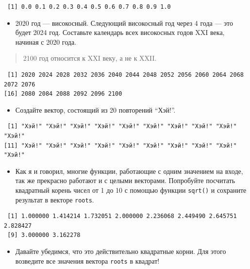 \documentclass[
]{book}
\providecommand{\tightlist}{%
  \setlength{\itemsep}{0pt}\setlength{\parskip}{0pt}}
\begin{document}
\begin{verbatim}
 [1] 0.0 0.1 0.2 0.3 0.4 0.5 0.6 0.7 0.8 0.9 1.0
\end{verbatim}

\begin{itemize}
\tightlist
\item
  2020 год --- високосный. Следующий високосный год через 4 года --- это будет 2024 год. Составьте календарь всех високосных годов XXI века, начиная с 2020 года.
\end{itemize}

\begin{quote}
2100 год относится к XXI веку, а не к XXII.
\end{quote}

\begin{verbatim}
 [1] 2020 2024 2028 2032 2036 2040 2044 2048 2052 2056 2060 2064 2068 2072 2076
[16] 2080 2084 2088 2092 2096 2100
\end{verbatim}

\begin{itemize}
\tightlist
\item
  Создайте вектор, состоящий из 20 повторений ``Хэй!''.
\end{itemize}

\begin{verbatim}
 [1] "Хэй!" "Хэй!" "Хэй!" "Хэй!" "Хэй!" "Хэй!" "Хэй!" "Хэй!" "Хэй!" "Хэй!"
[11] "Хэй!" "Хэй!" "Хэй!" "Хэй!" "Хэй!" "Хэй!" "Хэй!" "Хэй!" "Хэй!" "Хэй!"
\end{verbatim}

\begin{itemize}
\tightlist
\item
  Как я и говорил, многие функции, работающие с одним значением на входе, так же прекрасно работают и с целыми векторами. Попробуйте посчитать квадратный корень чисел от 1 до 10 с помощью функции \texttt{sqrt()} и сохраните результат в векторе \texttt{roots}.
\end{itemize}

\begin{verbatim}
 [1] 1.000000 1.414214 1.732051 2.000000 2.236068 2.449490 2.645751 2.828427
 [9] 3.000000 3.162278
\end{verbatim}

\begin{itemize}
\tightlist
\item
  Давайте убедимся, что это действительно квадратные корни. Для этого возведите все значения вектора \texttt{roots} в квадрат!
\end{itemize}
\end{document}
